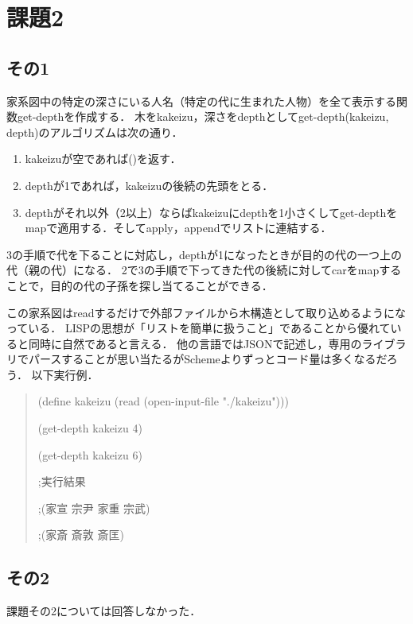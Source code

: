 \section{課題2}

\subsection{その1}
家系図中の特定の深さにいる人名（特定の代に生まれた人物）を全て表示する関数get-depthを作成する．
木をkakeizu，深さをdepthとしてget-depth(kakeizu, depth)のアルゴリズムは次の通り．

\begin{enumerate}
\item kakeizuが空であれば()を返す．
\item depthが1であれば，kakeizuの後続の先頭をとる．
\item depthがそれ以外（2以上）ならばkakeizuにdepthを1小さくしてget-depthをmapで適用する．そしてapply，appendでリストに連結する．
\end{enumerate}

3の手順で代を下ることに対応し，depthが1になったときが目的の代の一つ上の代（親の代）になる．
2で3の手順で下ってきた代の後続に対してcarをmapすることで，目的の代の子孫を探し当てることができる．

この家系図はreadするだけで外部ファイルから木構造として取り込めるようになっている．
LISPの思想が「リストを簡単に扱うこと」であることから優れていると同時に自然であると言える．
他の言語ではJSONで記述し，専用のライブラリでパースすることが思い当たるがSchemeよりずっとコード量は多くなるだろう．
以下実行例．

\begin{quote}

  (define kakeizu
    (read
       (open-input-file "./kakeizu")))

  (get-depth kakeizu 4)
  
  (get-depth kakeizu 6)
  
  ;実行結果
  
  ;(家宣 宗尹 家重 宗武)
  
  ;(家斎 斎敦 斎匡)

\end{quote}

\subsection{その2}

課題その2については回答しなかった．

